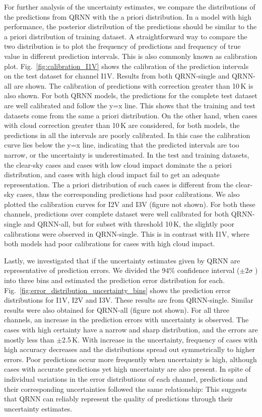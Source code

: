 \documentclass[amt, manuscript]{copernicus}
\begin{document}
For further analysis of the uncertainty estimates, we compare the distributions of the predictions from QRNN with the a priori distribution. In a model with high performance, the posterior distribution of the predictions should be similar to the a priori distribution of training dataset. A straightforward way to compare the two distribution is to plot the frequency of predictions and frequency of true value in different prediction intervals. This is also commonly known as calibration plot. Fig.~\ref{fig:calibration_I1V} shows the calibration of the prediction intervals on the test dataset for channel I1V. Results from both QRNN-single and QRNN-all are shown. The calibration of predictions with correction greater than 10\,K is also shown. For both QRNN models, the predictions for the complete test dataset are well calibrated and follow the y=x line. This shows that the training and test datasets come from the same a priori distribution. On the other hand, when cases with  cloud correction greater than 10\,K are considered, for both models, the predictions in all the intervals are poorly calibrated. In this case the calibration curve lies below the y=x line, indicating that the predicted intervals are too narrow, or the uncertainty is underestimated.  In the test and training datasets, the clear-sky cases and cases with low cloud impact dominate the a priori distribution, and cases with high cloud impact fail to get an adequate representation. The a priori distribution of such cases is different from the clear-sky cases, thus the corresponding predictions had poor calibrations.  We also plotted the calibration curves for I2V and I3V (figure not shown). For both these channels, predictions over complete dataset were well calibrated for both QRNN-single and QRNN-all, but for subset with threshold 10\,K, the slightly poor calibrations were observed in QRNN-single. This is in contrast with I1V, where both models had poor calibrations for cases with high cloud impact. 

Lastly, we investigated that if the uncertainty estimates given by QRNN are representative of prediction errors.  We divided the 94\% confidence interval ($\pm2\sigma$ ) into three bins and estimated the prediction error distribution for each.  Fig.~\ref{fig:error_distribution_uncertainty_bins} shows the prediction error distributions for I1V, I2V and I3V. These results are from QRNN-single. Similar results were also obtained for QRNN-all (figure not shown). For all three channels, an increase in the prediction errors with uncertainty is observed. The cases with high certainty have a narrow and sharp distribution, and the errors are mostly less than $\pm$2.5\,K. With increase in the uncertainty, frequency of cases with high accuracy decreases and the distributions spread out symmetrically to higher errors. Poor predictions occur more frequently when uncertainty is high, although cases with accurate predictions yet high uncertainty are also present. In spite of individual variations in the error distributions of each channel, predictions and their corresponding uncertainties followed the same relationship: This suggests that QRNN can reliably represent the quality of predictions through their uncertainty estimates.
\end{document}
